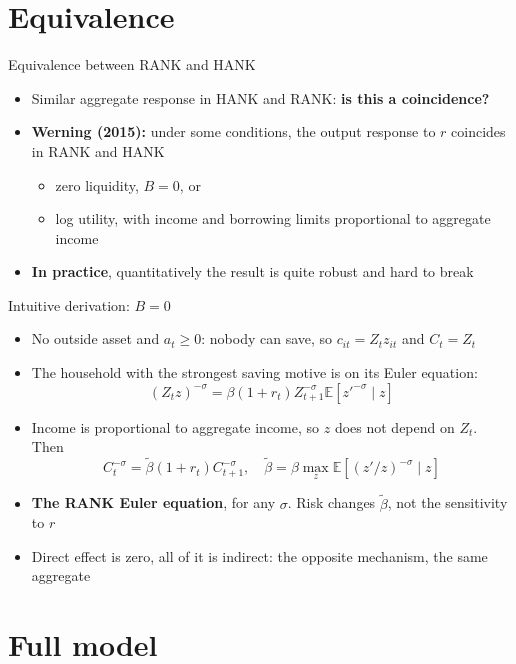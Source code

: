 \documentclass[10pt,english]{beamer}
\begin{document}
\section{Equivalence}

\begin{frame}{Equivalence between RANK and HANK}
\begin{itemize}
\item <+->Similar aggregate response in HANK and RANK: \textbf{is this a coincidence?}
\item <+->\textbf{Werning (2015):} under some conditions, the output response to $r$ coincides in RANK and HANK
\begin{itemize}
\item zero liquidity, $B=0$, or
\item log utility, with income and borrowing limits proportional to aggregate income
\end{itemize}
\item <+->\textbf{In practice}, quantitatively the result is quite robust and hard to break
\end{itemize}
\end{frame}
%
\begin{frame}{Intuitive derivation: $B=0$}
\begin{itemize}
\item <+->No outside asset and $a_{t}\geq0$: nobody can save, so $c_{it}=Z_{t}z_{it}$ and $C_{t}=Z_{t}$
\item <+->The household with the strongest saving motive is on its Euler equation:
\[
\left(Z_{t}z\right)^{-\sigma}=\beta\left(1+r_{t}\right)Z_{t+1}^{-\sigma}\mathbb{E}\left[z'^{-\sigma}\mid z\right]
\]
\item <+->Income is proportional to aggregate income, so $z$ does not depend on $Z_{t}$. Then
\[
C_{t}^{-\sigma}=\tilde{\beta}\left(1+r_{t}\right)C_{t+1}^{-\sigma},\quad\tilde{\beta}=\beta\max_{z}\mathbb{E}\left[\left(z'/z\right)^{-\sigma}\mid z\right]
\]
\item <+->\textbf{The RANK Euler equation}, for any $\sigma$. Risk changes $\tilde{\beta}$, not the sensitivity to $r$
\item <+->Direct effect is zero, all of it is indirect: the opposite mechanism, the same aggregate
\end{itemize}
\end{frame}
%

\section{Full model}
\end{document}
